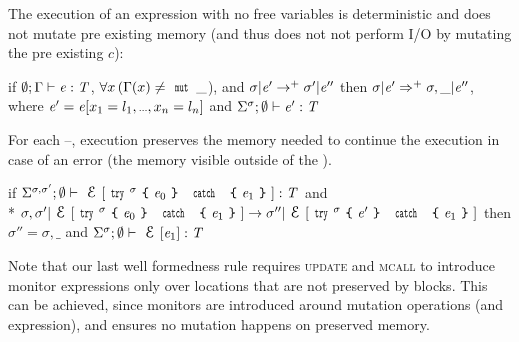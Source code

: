 The execution of an expression
with no \Q@mut@ free variables is deterministic and does not
mutate pre existing memory (and thus does not not perform I/O by mutating the pre existing $c$):
\begin{Assumption}[Determinism]\rm
	if $\emptyset;\Gamma\vdash {\ensuremath{\mathit{e}}}:{\mathit{T}}$, 
	$\forall x\, ( \Gamma(x)\neq\Kw{mut}\,\_$), and
	$\sigma | {\mathit{e}}'\rightarrow^+ \sigma' | {\mathit{e}}''$
	then 
	$\sigma | {\mathit{e}}'\Rightarrow^+ \sigma,\_ | {\mathit{e}}''$,
	where $\e'=\e[x_1=l_1,\ldots,x_n=l_n]$ and $\Sigma^\sigma;\emptyset\vdash {\ensuremath{\mathit{e}}}':{\mathit{T}}$
\end{Assumption}

\noindent For each \Q@try@--\Q@catch@, execution preserves the memory needed to continue the execution in case of an error (the memory visible outside of the \Q@try@).
\begin{Assumption}\rm
	if $\Sigma^{\sigma,\sigma'};\emptyset\vdash \ctx[\Kw{try}^\sigma\oC\e_0\cC\ \Kw{catch}\ \oC\e_1\cC]:\T$
	and\\*
	$
	\sigma,\sigma'|\ctx[\Kw{try}^\sigma\oC\e_0\cC\ \Kw{catch}\ \oC\e_1\cC]\rightarrow 
	\sigma''|\ctx[\Kw{try}^\sigma\oC\e'\cC\ \Kw{catch}\ \oC\e_1\cC]
	$
	then 
	$\sigma''=\sigma,\_$
	and
	$\Sigma^\sigma;\emptyset\vdash \ctx[\e_1]:\T$
\end{Assumption}


Note that our last well formedness rule requires 
\textsc{update} and \textsc{mcall} to introduce
monitor expressions only over locations
that are not preserved by \Q@try@ blocks.
This can be achieved, since monitors are introduced
around mutation operations
(and \Q@new@ expression),
and  ensures no mutation happens on preserved memory.




